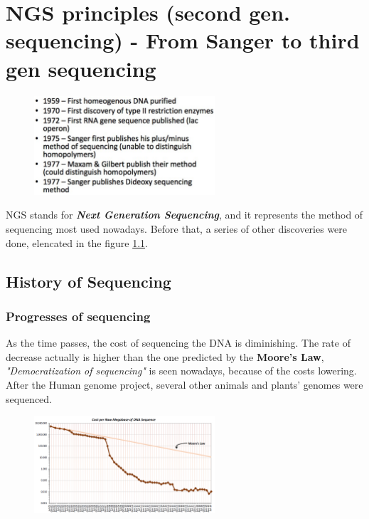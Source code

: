 \graphicspath{{chapters/images/03/}}

\chapter{NGS principles (second gen. sequencing) - From Sanger to third gen sequencing}

\begin{figure}[h]
\caption{}
\includegraphics[width=0.6\textwidth]{history-seq}
\label{discoveries-sequencing}
\end{figure}

NGS stands for \textbf{\textit{Next Generation Sequencing}}, and it represents the method of sequencing most used nowadays. Before that, a series of other discoveries were done, elencated in the figure \ref{discoveries-sequencing}. 

\section{History of Sequencing}
\subsection{Progresses of sequencing}
As the time passes, the cost of sequencing the DNA is diminishing. The rate of decrease actually is higher than the one predicted by the \textbf{Moore's Law}, \textit{"Democratization of sequencing"} is seen nowadays, because of the costs lowering. After the Human genome project, several other animals and plants' genomes were sequenced.

\begin{figure}[h]
\caption{}
\centering
\includegraphics[width=0.6\textwidth]{sequencingCost}
\label{Moore's law graph}
\end{figure}

